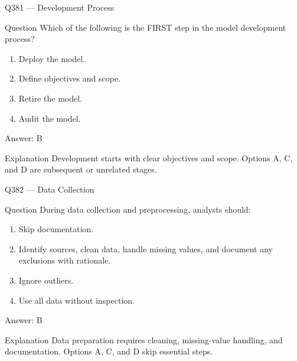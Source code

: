 \documentclass[aspectratio=169,8pt]{beamer}
\begin{document}
	\begin{frame}{Q381 --- Development Process}
		\begin{block}{Question}
			Which of the following is the FIRST step in the model development process?
			\begin{enumerate}
				\item Deploy the model.
				\item Define objectives and scope.
				\item Retire the model.
				\item Audit the model.
			\end{enumerate}
		\end{block}
		\begin{exampleblock}{Answer: B}\end{exampleblock}
		\begin{block}{Explanation}
			Development starts with clear objectives and scope. Options A, C, and D are subsequent or unrelated stages.
		\end{block}
	\end{frame}
	
	\begin{frame}{Q382 --- Data Collection}
		\begin{block}{Question}
			During data collection and preprocessing, analysts should:
			\begin{enumerate}
				\item Skip documentation.
				\item Identify sources, clean data, handle missing values, and document any exclusions with rationale.
				\item Ignore outliers.
				\item Use all data without inspection.
			\end{enumerate}
		\end{block}
		\begin{exampleblock}{Answer: B}\end{exampleblock}
		\begin{block}{Explanation}
			Data preparation requires cleaning, missing-value handling, and documentation. Options A, C, and D skip essential steps.
		\end{block}
	\end{frame}
	
\end{document}
